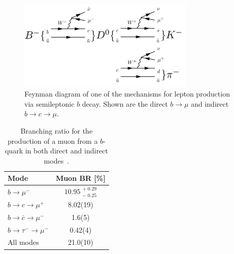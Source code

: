 \begin{figure}[htbp]
  \centering
    \includegraphics[width=0.75\textwidth]{PartDetector/Diagrams/SemiLeptonicDecay.pdf}
    \caption[Feynman diagram of one of the mechanisms for lepton production via semileptonic $b$ decay.]{Feynman diagram of one of the mechanisms for lepton production via semileptonic $b$ decay. Shown are the direct $b\rightarrow \mu$ and indirect $b\rightarrow c\rightarrow\mu$.}\label{fig:DetectorSLTFeynm}
\end{figure}

\begin{table}[htbp]
  \centering
    \begin{tabular}{@{}lS[table-format=2.2(2)]@{}}
      \toprule
      Mode                                        & {Muon BR [\si{\percent}]} \\
      \midrule %
      $b\rightarrow \mu^{-}$                      & {$\num{10.95}\;^{+\;0.29}_{-\;0.25}$} \\
      $b\rightarrow c \rightarrow \mu^{+}$        & 8.02(19) \\
      $b\rightarrow \bar{c} \rightarrow \mu^{-}$  & 1.6(5) \\
      $b\rightarrow \tau^{-} \rightarrow \mu^{-}$ & 0.42(4) \\
      \midrule %
      All modes                                   & 21.0(10) \\
      \bottomrule %
    \end{tabular}
    \caption[Branching ratio for the production of a muon from a $b$-quark in both direct and indirect modes.]{Branching ratio for the production of a muon from a $b$-quark in both direct and indirect modes~\cite{Theory:PDGBooklet}.}\label{tab:DetectorSLTBR}
\end{table}

